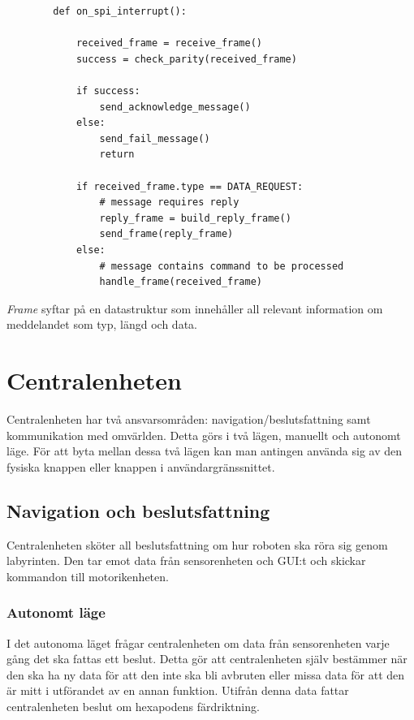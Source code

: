 \documentclass[a4paper,titlepage,12pt]{article}
\begin{document}
	\begin{lstlisting}
        def on_spi_interrupt():
			
            received_frame = receive_frame()
            success = check_parity(received_frame)

            if success:
                send_acknowledge_message()
            else:
                send_fail_message()
                return

            if received_frame.type == DATA_REQUEST:
                # message requires reply
                reply_frame = build_reply_frame()
                send_frame(reply_frame)
            else:
                # message contains command to be processed
                handle_frame(received_frame)

	\end{lstlisting}
    \textit{Frame} syftar på en datastruktur som innehåller all relevant
    information om meddelandet som typ, längd och data.

	\section{Centralenheten}
        Centralenheten har två ansvarsområden: navigation/beslutsfattning samt
        kommunikation med omvärlden. Detta görs i två lägen, manuellt och autonomt
        läge. För att byta mellan dessa två lägen kan man antingen använda sig av den
        fysiska knappen eller knappen i användargränssnittet.

	\subsection{Navigation och beslutsfattning}
	Centralenheten sköter all beslutsfattning om hur roboten ska röra sig
	genom labyrinten. Den tar emot data från sensorenheten och GUI:t och
	skickar kommandon till motorikenheten.
  
	\subsubsection{Autonomt läge}
	\label{sec:central-autonom} 
	I det autonoma läget frågar centralenheten om data från sensorenheten
    varje gång det ska fattas ett beslut. Detta gör att centralenheten själv
    bestämmer när den ska ha ny data för att den inte ska bli avbruten eller missa
    data för att den är mitt i utförandet av en annan funktion. Utifrån denna data
    fattar centralenheten beslut om hexapodens färdriktning.
\end{document}
